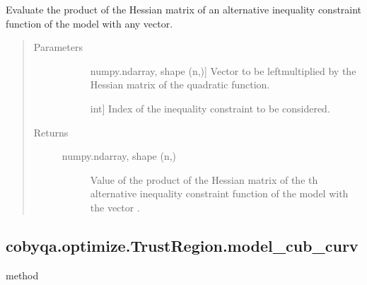 \documentclass[letterpaper,10pt,english]{sphinxmanual}
\begin{document}
\begin{fulllineitems}
\begin{fulllineitems}
\label{\detokenize{refs/generated/cobyqa.optimize.TrustRegion.model_cub_alt_hessp:cobyqa.optimize.TrustRegion.model_cub_alt_hessp}}
\sphinxAtStartPar
Evaluate the product of the Hessian matrix of an alternative inequality
constraint function of the model with any vector.
\begin{quote}\begin{description}
\item[{Parameters}] \leavevmode\begin{description}
\item[{}] \leavevmode{[}numpy.ndarray, shape (n,){]}
\sphinxAtStartPar
Vector to be left\sphinxhyphen{}multiplied by the Hessian matrix of the quadratic
function.

\item[{}] \leavevmode{[}int{]}
\sphinxAtStartPar
Index of the inequality constraint to be considered.

\end{description}

\item[{Returns}] \leavevmode\begin{description}
\item[{numpy.ndarray, shape (n,)}] \leavevmode
\sphinxAtStartPar
Value of the product of the Hessian matrix of the \sphinxhyphen{}th alternative
inequality constraint function of the model with the vector .

\end{description}

\end{description}\end{quote}

\end{fulllineitems}



\subsection{cobyqa.optimize.TrustRegion.model\_cub\_curv}
\label{\detokenize{refs/generated/cobyqa.optimize.TrustRegion.model_cub_curv:cobyqa-optimize-trustregion-model-cub-curv}}\label{\detokenize{refs/generated/cobyqa.optimize.TrustRegion.model_cub_curv::doc}}
\sphinxAtStartPar
method


\end{fulllineitems}
\end{document}
